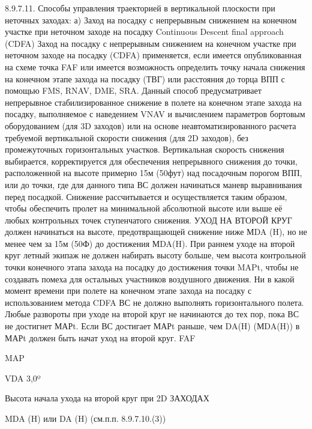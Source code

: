 8.9.7.11.	Способы управления траекторией в вертикальной плоскости при неточных заходах:
а)	Заход на посадку с непрерывным снижением на конечном участке при неточном заходе на посадку Continuous Descent final approach (CDFA)
Заход на посадку с непрерывным снижением на конечном участке при неточном заходе на посадку (CDFA) применяется, если имеется опубликованная на схеме точка FAF или имеется возможность определить точку начала снижения на конечном этапе захода на посадку (ТВГ) или расстояния до торца ВПП с помощью FMS, RNAV, DME, SRA.
Данный способ предусматривает непрерывное стабилизированное снижение в полете на конечном этапе захода на посадку, выполняемое с наведением VNAV и вычислением параметров бортовым оборудованием (для 3D заходов) или на основе неавтоматизированного расчета требуемой вертикальной скорости снижения (для 2D заходов), без промежуточных горизонтальных участков. Вертикальная скорость снижения выбирается, корректируется для обеспечения непрерывного снижения до точки, расположенной на высоте примерно 15м (50фут) над посадочным порогом ВПП, или до точки, где для данного типа ВС должен начинаться маневр выравнивания перед посадкой. Снижение рассчитывается и осуществляется таким образом, чтобы обеспечить пролет на минимальной абсолютной высоте или выше её любых контрольных точек ступенчатого снижения.
УХОД НА ВТОРОЙ КРУГ должен начинаться на высоте, предотвращающей снижение ниже МDA (H), но не менее чем за 15м (50Ф) до достижения МDA(H). При раннем уходе на второй круг летный экипаж не должен набирать высоту больше, чем высота контрольной точки конечного этапа захода на посадку до достижения точки MAPt, чтобы не создавать помеха для остальных участников воздушного движения.
Ни в какой момент времени при полете на конечном этапе захода на посадку с использованием метода CDFA ВС не должно выполнять горизонтального полета.
Любые развороты при уходе на второй круг не начинаются до тех пор, пока ВС не достигнет МАРt. Если ВС достигает МАРt раньше, чем DA(H) (МDA(H)) в МАРt должен быть начат уход на второй круг.
                FAF

       	                                                                                                            MAP

                                                  VDA 3,0º


              Высота начала ухода на второй круг             при 2D ЗАХОДАХ
                         
            
 
              MDA (H) или DA (H) (см.п.п. 8.9.7.10.(3))

